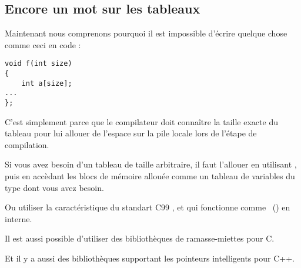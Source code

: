 \subsection{Encore un mot sur les tableaux}


Maintenant nous comprenons pourquoi il est impossible d'écrire quelque chose comme
ceci en code \CCpp:

\begin{lstlisting}[style=customc]
void f(int size)
{
    int a[size];
...
};
\end{lstlisting}


C'est simplement parce que le compilateur doit connaître la taille exacte du tableau
pour lui allouer de l'espace sur la pile locale lors de l'étape de compilation.


Si vous avez besoin d'un tableau de taille arbitraire, il faut l'allouer en utilisant
, puis en accèdant les blocs de mémoire allouée comme un tableau de
variables du type dont vous avez besoin.


Ou utiliser la caractéristique du standart C99 ,
et qui fonctionne comme ~() en interne.


Il est aussi possible d'utiliser des bibliothèques de ramasse-miettes pour C.

Et il y a aussi des bibliothèques supportant les pointeurs intelligents pour C++.

